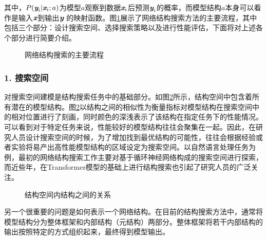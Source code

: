 \noindent 其中，${P}(\textbf{\em y}_{i}|\textbf{\em x}_{i};a)$为模型$a$观察到数据$\textbf{\em x}_{i}$后预测$\textbf{\em y}_{i}$的概率，而模型结构$a$本身可以看作是输入$\textbf{\em x}$到输出$\textbf{\em y}$ 的映射函数。图\ref{fig:15-29}展示了网络结构搜索方法的主要流程，其中包括三个部分：设计搜索空间、选择搜索策略以及进行性能评估，下面将对上述各个部分进行简要介绍。

\begin{figure}[htp]
\centering

\caption{网络结构搜索的主要流程}
\label{fig:15-29}
\end{figure}


\subsubsection{1. 搜索空间}

\parinterval 对搜索空间建模是结构搜索任务中的基础部分。如图\ref{fig:15-30}所示，结构空间中包含着所有潜在的模型结构。图\ref{fig:15-30}以结构之间的相似性为衡量指标对模型结构在搜索空间中的相对位置进行了刻画，同时颜色的深浅表示了该结构在指定任务下的性能情况。可以看到对于特定任务来说，性能较好的模型结构往往会聚集在一起。因此，在研究人员设计搜索空间的时候，为了增加找到最优结构的可能性，往往会根据经验或者实验将易产出高性能模型结构的区域设定为搜索空间。以自然语言处理任务为例，最初的网络结构搜索工作主要对基于循环神经网络构成的搜索空间进行探索，而近些年，在Transformer模型的基础上进行结构搜索也引起了研究人员的广泛关注。

\begin{figure}[htp]
\centering
\vspace{-5em}

\caption{结构空间内结构之间的关系}
\label{fig:15-30}
\end{figure}

\parinterval 另一个很重要的问题是如何表示一个网络结构。在目前的结构搜索方法中，通常将模型结构分为整体框架和内部结构（元结构）两部分。整体框架将若干内部结构的输出按照特定的方式组织起来，最终得到模型输出。

